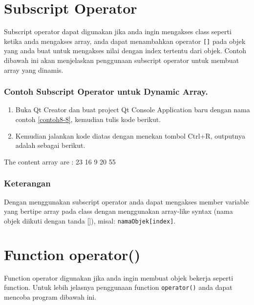 \section{Subscript Operator}\label{subscript-operator}

Subscript operator dapat digunakan jika anda ingin mengakses class
seperti ketika anda mengakses array, anda dapat menambahkan operator
\texttt{{[}{]}} pada objek yang anda buat untuk mengakses nilai dengan
index tertentu dari objek. Contoh dibawah ini akan menjelaskan
penggunaan subscript operator untuk membuat array yang dinamis.

\subsubsection*{Contoh Subscript Operator untuk Dynamic Array.}

\begin{enumerate}

\item
 Buka Qt Creator dan buat project Qt Console Application baru dengan
 nama contoh \ref{contoh8-8}, kemudian tulis kode berikut.




\item
 Kemudian jalankan kode diatas dengan menekan tombol Ctrl+R, outputnya
 adalah sebagai berikut.
\end{enumerate}

\begin{lcverbatim}
The content array are : {23 16 9 20 55 }
\end{lcverbatim}

\subsubsection*{Keterangan}

Dengan menggunakan subscript operator anda dapat mengakses member
variable yang bertipe array pada class dengan menggunakan array-like
syntax (nama objek diikuti dengan tanda {[}{]}), misal:
\texttt{namaObjek{[}index{]}}.

\section{Function operator()}\label{function-operator}

Function operator digunakan jika anda ingin membuat objek bekerja
seperti function. Untuk lebih jelasnya penggunaan function
\texttt{operator()} anda dapat mencoba program dibawah ini.


